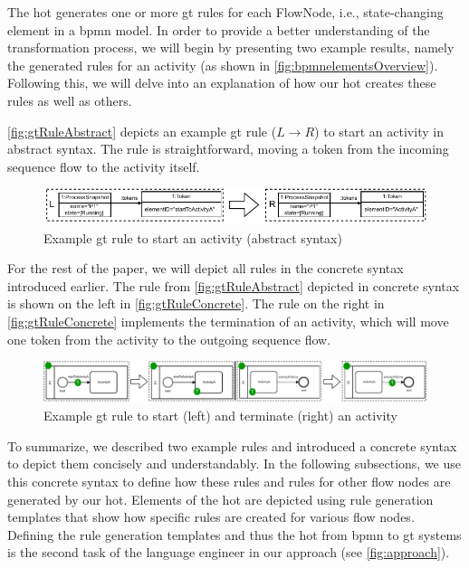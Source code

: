\documentclass{lmcs} %
\theoremstyle{plain}\newtheorem{satz}[thm]{Satz} %
\begin{document}
The \gls*{hot} generates one or more \gls*{gt} rules for each \textsf{FlowNode}, i.e., state-changing element in a \gls*{bpmn} model.
In order to provide a better understanding of the transformation process, we will begin by presenting two example results, namely the generated rules for an activity (as shown in \autoref{fig:bpmnelementsOverview}).
Following this, we will delve into an explanation of how our \gls*{hot} creates these rules as well as others.

\autoref{fig:gtRuleAbstract} depicts an example \gls*{gt} rule ($L \to R$) to start an activity in abstract syntax.
The rule is straightforward, moving a token from the incoming sequence flow to the activity itself.

\begin{figure}[ht]
    \centering
  \includegraphics[width=1\textwidth]{images/rule_abstract.pdf}
  \caption{Example \gls*{gt} rule to start an activity (abstract syntax)}  \label{fig:gtRuleAbstract}
\end{figure}

For the rest of the paper, we will depict all rules in the concrete syntax introduced earlier.
The rule from \autoref{fig:gtRuleAbstract} depicted in concrete syntax is shown on the left in \autoref{fig:gtRuleConcrete}.
The rule on the right in \autoref{fig:gtRuleConcrete} implements the termination of an activity, which will move one token from the activity to the outgoing sequence flow.

\begin{figure}[ht]
    \centering
  \includegraphics[width=1\textwidth]{images/rule_concrete.pdf}
  \caption{Example \gls*{gt} rule to start (left) and terminate (right) an activity}
  \label{fig:gtRuleConcrete}
\end{figure}

To summarize, we described two example rules and introduced a concrete syntax to depict them concisely and understandably.
In the following subsections, we use this concrete syntax to define how these rules and rules for other flow nodes are generated by our \gls*{hot}.
Elements of the \gls*{hot} are depicted using rule generation templates that show how specific rules are created for various flow nodes.
Defining the rule generation templates and thus the \gls*{hot} from \gls*{bpmn} to \gls*{gt} systems is the second task of the language engineer in our approach (see \autoref{fig:approach}).
\end{document}
